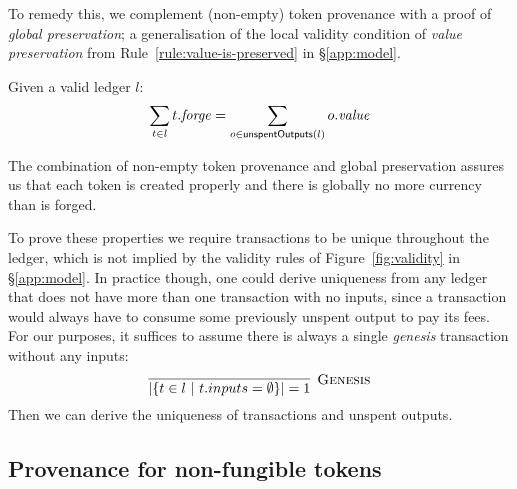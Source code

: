 To remedy this, we complement (non-empty) token provenance with a
proof of \textit{global preservation}; a generalisation of the
local validity condition of \textit{value preservation} from
Rule~\ref{rule:value-is-preserved} in \S\ref{app:model}.

\begin{proposition}
Given a valid ledger $l$:
\begin{displaymath}
\sum_{t \in l} t.\mathit{forge} = \sum_{o \in \mathsf{unspentOutputs}(l)} o.\mathit{value}
\end{displaymath}
\end{proposition}

The combination of non-empty token provenance and global preservation
assures us that each token is created properly and there is globally
no more currency than is forged.

To prove these properties we require transactions to be unique
throughout the ledger, which is not implied by the validity rules of
Figure~\ref{fig:validity} in \S\ref{app:model}.  In practice though, one could derive
uniqueness from any ledger that does not have more than one
transaction with no inputs, since a transaction would always have to
consume some previously unspent output to pay its fees.
For our purposes, it suffices to assume there is always a single
\textit{genesis} transaction without any inputs:
\begin{displaymath}
\infer[\textsc{Genesis}]
  {|\{ t \in l\ | \ t.inputs = \emptyset \}| = 1}
  {}
\end{displaymath}
%
Then we can derive the uniqueness of transactions and unspent outputs.

\subsection{Provenance for non-fungible tokens}

